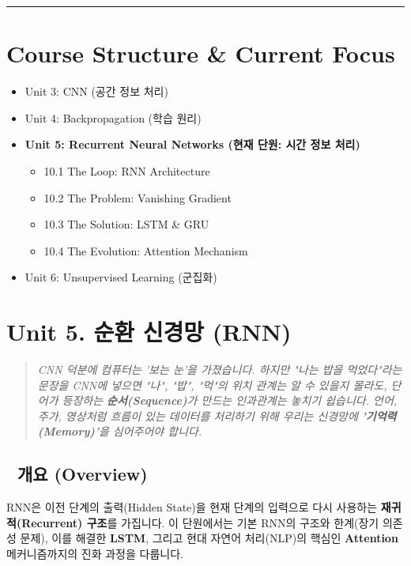 \documentclass[11pt,a4paper]{book}
\theoremstyle{definition}
\begin{document}

\vspace{1cm}
\hrule
\vspace{1cm}

\section*{Course Structure \& Current Focus}
\begin{itemize}
    \item Unit 3: CNN (공간 정보 처리)
    \item Unit 4: Backpropagation (학습 원리)
    \item \textbf{\textcolor{mainblue}{Unit 5: Recurrent Neural Networks (현재 단원: 시간 정보 처리)}}
    \begin{itemize}
        \item 10.1 The Loop: RNN Architecture
        \item 10.2 The Problem: Vanishing Gradient
        \item 10.3 The Solution: LSTM \& GRU
        \item 10.4 The Evolution: Attention Mechanism
    \end{itemize}
    \item Unit 6: Unsupervised Learning (군집화)
\end{itemize}


\section{Unit 5. 순환 신경망 (RNN)}

\begin{quote}
\textit{CNN 덕분에 컴퓨터는 '보는 눈'을 가졌습니다. 하지만 "나는 밥을 먹었다"라는 문장을 CNN에 넣으면 "나", "밥", "먹"의 위치 관계는 알 수 있을지 몰라도, 단어가 등장하는 \textbf{순서(Sequence)}가 만드는 인과관계는 놓치기 쉽습니다. 언어, 주가, 영상처럼 흐름이 있는 데이터를 처리하기 위해 우리는 신경망에 \textbf{'기억력(Memory)'}을 심어주어야 합니다.}
\end{quote}

\subsection*{📌 개요 (Overview)}
RNN은 이전 단계의 출력(Hidden State)을 현재 단계의 입력으로 다시 사용하는 \textbf{재귀적(Recurrent) 구조}를 가집니다. 이 단원에서는 기본 RNN의 구조와 한계(장기 의존성 문제), 이를 해결한 \textbf{LSTM}, 그리고 현대 자연어 처리(NLP)의 핵심인 \textbf{Attention} 메커니즘까지의 진화 과정을 다룹니다.
\end{document}
